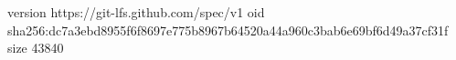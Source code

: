 version https://git-lfs.github.com/spec/v1
oid sha256:dc7a3ebd8955f6f8697e775b8967b64520a44a960c3bab6e69bf6d49a37cf31f
size 43840
